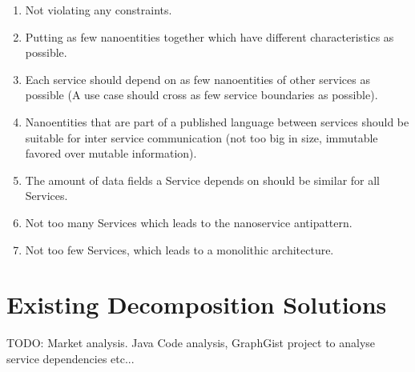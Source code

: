 \begin{enumerate}
	\item Not violating any constraints.
	\item Putting as few nanoentities together which have different characteristics as possible.
	\item Each service should depend on as few nanoentities of other services as possible (A use case should cross as few service boundaries as possible).
	\item Nanoentities that are part of a published language between services should be suitable for inter service communication (not too big in size, immutable favored over mutable information).
	\item The amount of data fields a Service depends on should be similar for all Services.
	\item Not too many Services which leads to the nanoservice antipattern\cite{nanoservice}.
	\item Not too few Services, which leads to a monolithic architecture.
\end{enumerate}

\section{Existing Decomposition Solutions}

TODO: Market analysis. Java Code analysis, GraphGist project to analyse service dependencies etc...






